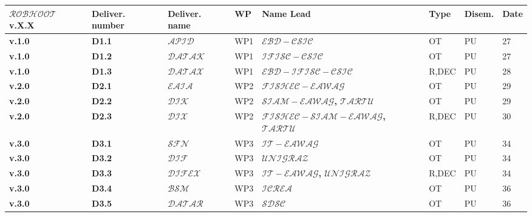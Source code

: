 \documentclass[11pt, a4paper]{article} %
\begin{document}
\begin{table}[h!]
\begin{center}
  \begin{tabular}{|m{1.9cm} || m{1.25cm} || m{1.75cm} || m{0.75cm} || m{4.85cm} || m{1.2cm} || m{1cm} || m{1cm}|}
  \hline\hline
  \rowcolor{lightpink!30}
  {\bf $\mathcal{ROBHOOT}$ v.X.X} & {\bf Deliver. number} & {\bf Deliver. name} & {\bf WP} & {\bf Name Lead} & {\bf Type} & {\bf Disem.} & {\bf Date} \\
  \hline\hline
  \rowcolor{piggypink!20}
  {\bf v.1.0} & {\bf D1.1} & $\mathcal{APID}$ & WP1 & {\bf $\mathcal{EBD-CSIC}$} & OT & PU & 27 \\
  \hline\hline
  \rowcolor{piggypink!20}
  {\bf v.1.0} & {\bf D1.2} & $\mathcal{DATAK}$ & WP1 & {\bf $\mathcal{IFISC-CSIC}$} & OT & PU  & 27 \\
  \hline\hline
  \rowcolor{piggypink!20}
  {\bf v.1.0} & {\bf D1.3} & $\mathcal{DATAX}$ & WP1 & {\bf $\mathcal{EBD-IFISC-CSIC}$} & R,DEC & PU  & 28 \\
    \hline\hline
 \rowcolor{piggypink!40}
  {\bf v.2.0} & {\bf D2.1} & $\mathcal{EAIA}$ & WP2 & {\bf $\mathcal{FISHEC-EAWAG}$} & OT & PU & 29 \\
  \hline\hline
  \rowcolor{piggypink!40}
  {\bf v.2.0} & {\bf D2.2} & $\mathcal{DIK}$ & WP2 & {\bf $\mathcal{SIAM-EAWAG}$, $\mathcal{TARTU}$} & OT & PU  & 29 \\
  \hline\hline
  \rowcolor{piggypink!40}
    {\bf v.2.0} & {\bf D2.3} & $\mathcal{DIX}$ & WP2 & {\small {\bf $\mathcal{FISHEC-SIAM-EAWAG}$, $\mathcal{TARTU}$}} & R,DEC & PU & 30 \\
    \hline\hline
   \rowcolor{piggypink!60}
  {\bf v.3.0} & {\bf D3.1} & $\mathcal{SFN}$ & WP3 & {\bf $\mathcal{IT-EAWAG}$} & OT & PU & 34 \\
  \hline\hline
   \rowcolor{piggypink!60}
  {\bf v.3.0} & {\bf D3.2} & $\mathcal{DIF}$ & WP3 & {\bf $\mathcal{UNIGRAZ}$} & OT & PU & 34 \\
  \hline\hline
  \rowcolor{piggypink!60}
    {\bf v.3.0} & {\bf D3.3} & $\mathcal{DIFEX}$ & WP3 & {\bf $\mathcal{IT-EAWAG}$, $\mathcal{UNIGRAZ}$} & R,DEC & PU & 34 \\
  \hline\hline
   \rowcolor{piggypink!80}
  {\bf v.3.0} & {\bf D3.4} & $\mathcal{BSM}$ & WP3 & {\bf $\mathcal{ICREA}$} & OT & PU  & 36 \\
    \hline\hline
     \rowcolor{piggypink!80}
  {\bf v.3.0} & {\bf D3.5} & $\mathcal{DATAR}$ & WP3 & {\bf $\mathcal{SDSC}$} & OT & PU  & 36 \\

\end{tabular}
\end{center}
\end{table}
\end{document}
